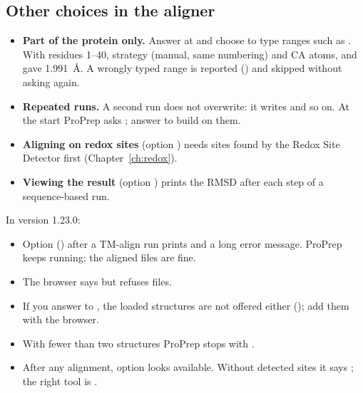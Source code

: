 \subsection{Other choices in the aligner}

\begin{itemize}
  \item \textbf{Part of the protein only.} Answer  at
         and choose  to
        type ranges such as . With residues 1--40, strategy
         (manual, same numbering) and CA atoms,  and
         gave 1.991~Å. A wrongly typed range is reported
        () and skipped without
        asking again.
  \item \textbf{Repeated runs.} A second run does not overwrite: it writes
         and so on. At the start ProPrep asks
        ;
        answer  to build on them.
  \item \textbf{Aligning on redox sites} (option ) needs sites found by
        the Redox Site Detector  first (Chapter~\ref{ch:redox}).
  \item \textbf{Viewing the result} (option ) prints the RMSD after each
        step of a sequence-based run.
\end{itemize}

\begin{watchout}
In version 1.23.0:
\begin{itemize}
  \item Option  () after a TM-align run
        prints  and a long error message. ProPrep keeps running; the aligned
        files are fine.
  \item The browser says  but refuses  files.
  \item If you answer  to , the loaded structures are not offered either
        (); add them with the browser.
  \item With fewer than two structures ProPrep stops with
        .
  \item After any alignment, option  looks available. Without detected
        sites it says ; the right tool is .
\end{itemize}
\end{watchout}

